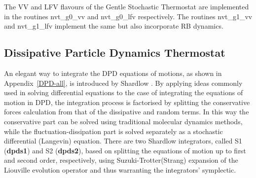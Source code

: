 The VV and LFV flavours of the Gentle Stochastic Thermostat are implemented in
the \D routines {\sc nvt\_g0\_vv} and {\sc nvt\_g0\_lfv} respectively.
The routines {\sc nvt\_g1\_vv} and {\sc nvt\_g1\_lfv} implement the
same but also incorporate RB dynamics.

\subsection{Dissipative Particle Dynamics Thermostat} \label{dpd}

An elegant way to integrate the DPD equations of motions, as shown
in Appendix~\ref{DPD-all}, is introduced by Shardlow \cite{shardlow-03a}.
By applying ideas commonly used in solving differential equations
to the case of integrating the equations of motion in DPD, the
integration process is factorised by splitting the conservative forces
calculation from that of the dissipative and random terms.  In this way
the conservative part can be solved using traditional molecular dynamics
methods, while the fluctuation-dissipation part is solved separately as
a stochastic differential (Langevin) equation.  There are two Shardlow
integrators, called S1 ({\bf dpds1}) and S2 ({\bf dpds2}), based on
splitting the equations of motion up to first and second order,
respectively, using Suzuki-Trotter(Strang) expansion of the Liouville
evolution operator and thus warranting the integrators' symplectic.

